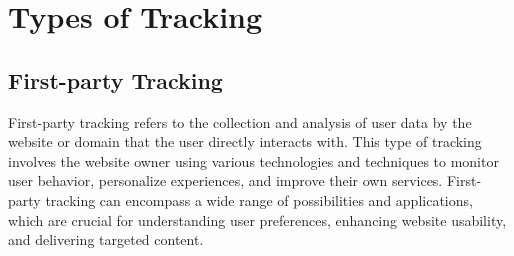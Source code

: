 \section{Types of Tracking}
\subsection{First-party Tracking}

First-party tracking refers to the collection and analysis of user data by the website or domain that the user directly
interacts with. This type of tracking involves the website owner using various technologies and techniques to monitor user
behavior, personalize experiences, and improve their own services. First-party tracking can encompass a wide range of
possibilities and applications, which are crucial for understanding user preferences, enhancing website usability,
and delivering targeted content.
